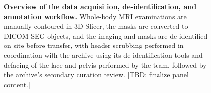 \begin{figure}[t]
\centering
{}
\caption{\textbf{Overview of the data acquisition, de-identification, and annotation workflow.}
Whole-body MRI examinations are manually contoured in 3D Slicer, the masks are converted to DICOM-SEG objects, and the imaging and masks are de-identified on site before transfer, with header scrubbing performed in coordination with the archive using its de-identification tools and defacing of the face and pelvis performed by the team, followed by the archive's secondary curation review. [TBD: finalize panel content.]}
\label{fig:workflow}
\end{figure}
